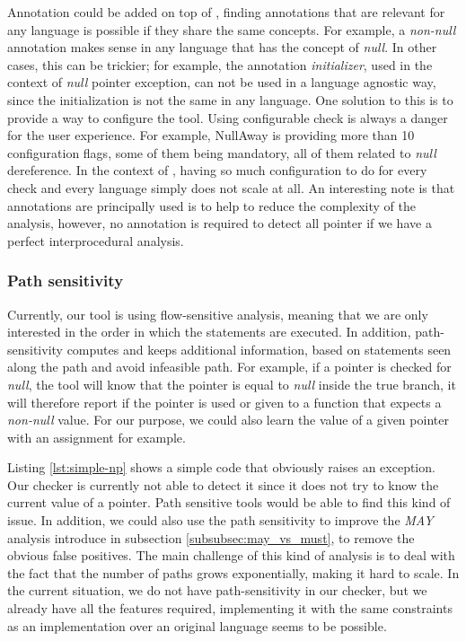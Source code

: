 Annotation could be added on top of \slang{}, finding annotations that are relevant for any language is possible if they share the same concepts. 
For example, a \emph{non-null} annotation makes sense in any language that has the concept of \emph{null}. 
In other cases, this can be trickier; for example, the annotation \emph{initializer}, used in the context of \emph{null} pointer exception, can not be used in a language agnostic way, since the initialization is not the same in any language.\newline
One solution to this is to provide a way to configure the tool. 
Using configurable check is always a danger for the user experience. For example, NullAway is providing more than 10 configuration flags, some of them being mandatory, all of them related to \emph{null} dereference. 
In the context of \slang{}, having so much configuration to do for every check and every language simply does not scale at all.\newline
An interesting note is that annotations are principally used is to help to reduce the complexity of the analysis, however, no annotation is required to detect all pointer if we have a perfect interprocedural analysis.

\subsubsection{Path sensitivity}
\label{subsubsec:path_sensitivity}

Currently, our tool is using flow-sensitive analysis, meaning that we are only interested in the order in which the statements are executed.
In addition, path-sensitivity computes and keeps additional information, based on statements seen along the path and avoid infeasible path. 
For example, if a pointer is checked for \emph{null}, the tool will know that the pointer is equal to \emph{null} inside the true branch, it will therefore report if the pointer is used or given to a function that expects a \emph{non-null} value.
For our purpose, we could also learn the value of a given pointer with an assignment for example.



Listing \ref{lst:simple-np} shows a simple code that obviously raises an exception. Our checker is currently not able to detect it since it does not try to know the current value of a pointer.
Path sensitive tools would be able to find this kind of issue.
In addition, we could also use the path sensitivity to improve the \emph{MAY} analysis introduce in subsection \ref{subsubsec:may_vs_must}, to remove the obvious false positives. 
The main challenge of this kind of analysis is to deal with the fact that the number of paths grows exponentially, making it hard to scale. 
In the current situation, we do not have path-sensitivity in our checker, but we already have all the features required, implementing it with the same constraints as an implementation over an original language seems to be possible.

